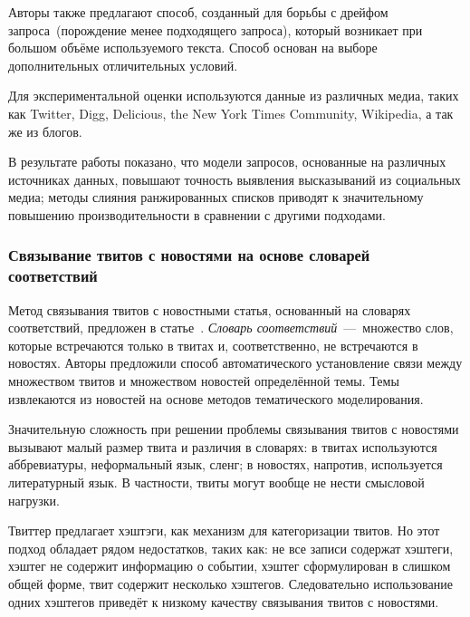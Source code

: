         Авторы также предлагают способ, созданный для борьбы с дрейфом запроса~(порождение менее подходящего запроса), который возникает при большом объёме используемого текста.
        Способ основан на выборе дополнительных отличительных условий.

        Для экспериментальной оценки используются данные из различных медиа, таких как Twitter, Digg, Delicious, the New York Times Community, Wikipedia, а так же из блогов.

        В результате работы показано, что модели запросов, основанные на различных источниках данных, повышают точность выявления высказываний из социальных медиа;
        методы слияния ранжированных списков приводят к значительному повышению производительности в сравнении с другими подходами.

    \subsubsection{Связывание твитов с новостями на основе словарей соответствий}
        Метод связывания твитов с новостными статья, основанный на словарях соответствий,
        предложен в статье~\cite{bridging}. \textit{Словарь соответствий}~---~множество слов,
        которые встречаются только в твитах и, соответственно, не встречаются в новостях.
        Авторы предложили способ автоматического установление связи между множеством твитов и множеством новостей определённой темы.
        Темы извлекаются из новостей на основе методов тематического моделирования.

        Значительную сложность при решении проблемы связывания твитов с новостями вызывают малый размер твита и различия в словарях: в твитах используются аббревиатуры,
        неформальный язык, сленг; в новостях, напротив, используется литературный язык.
        В частности, твиты могут вообще не нести смысловой нагрузки.

        Твиттер предлагает хэштэги, как механизм для категоризации твитов.
        Но этот подход обладает рядом недостатков, таких как: не все записи содержат хэштеги, хэштег не содержит информацию о событии, хэштег сформулирован в слишком общей форме,
        твит содержит несколько хэштегов.
        Следовательно использование одних хэштегов приведёт к низкому качеству связывания твитов с новостями.

